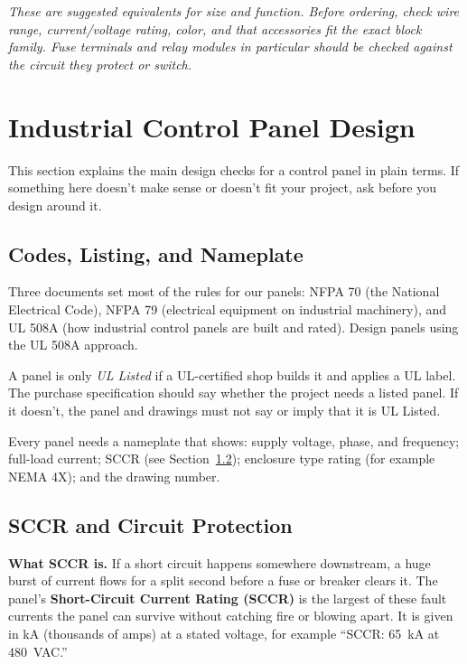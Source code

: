 \textit{\small These are suggested equivalents for size and function. Before ordering, check wire range, current/voltage rating, color, and that accessories fit the exact block family. Fuse terminals and relay modules in particular should be checked against the circuit they protect or switch.}

\section{Industrial Control Panel Design}
This section explains the main design checks for a control panel in plain terms. If something here doesn't make sense or doesn't fit your project, ask before you design around it.

\subsection{Codes, Listing, and Nameplate}
Three documents set most of the rules for our panels: NFPA 70 (the National Electrical Code), NFPA 79 (electrical equipment on industrial machinery), and UL 508A (how industrial control panels are built and rated). Design panels using the UL 508A approach.


A panel is only \emph{UL Listed} if a UL-certified shop builds it and applies a UL label. The purchase specification should say whether the project needs a listed panel. If it doesn't, the panel and drawings must not say or imply that it is UL Listed.

Every panel needs a nameplate that shows: supply voltage, phase, and frequency; full-load current; SCCR (see Section~\ref{sec:sccr}); enclosure type rating (for example NEMA 4X); and the drawing number.

\subsection{SCCR and Circuit Protection}\label{sec:sccr}
\textbf{What SCCR is.} If a short circuit happens somewhere downstream, a huge burst of current flows for a split second before a fuse or breaker clears it. The panel's \textbf{Short-Circuit Current Rating (SCCR)} is the largest of these fault currents the panel can survive without catching fire or blowing apart. It is given in kA (thousands of amps) at a stated voltage, for example ``SCCR: 65~kA at 480~VAC.''

